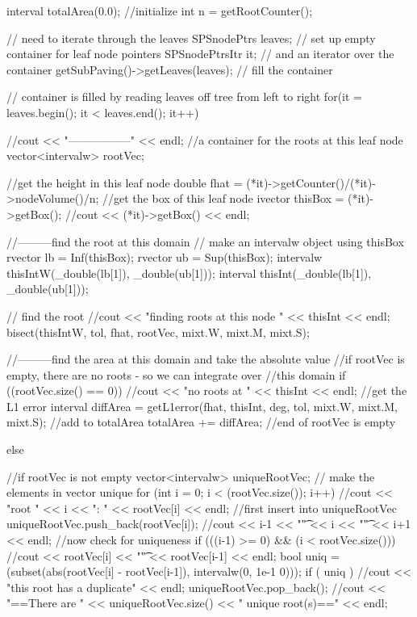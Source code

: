 \begin{DoxyCode}
{
  interval totalArea(0.0); //initialize
  int n = getRootCounter();

  // need to iterate through the leaves
  SPSnodePtrs leaves; // set up empty container for leaf node pointers
  SPSnodePtrsItr it; // and an iterator over the container
  getSubPaving()->getLeaves(leaves); // fill the container
  
  // container is filled by reading leaves off tree from left to right
  for(it = leaves.begin(); it < leaves.end(); it++) {
    //cout << "-----------------" << endl;
    //a container for the roots at this leaf node
    vector<intervalw> rootVec;
    
    //get the height in this leaf node
    double fhat = (*it)->getCounter()/(*it)->nodeVolume()/n;
    //get the box of this leaf node
    ivector thisBox = (*it)->getBox();
    //cout << (*it)->getBox() << endl;
    
    //---------find the root at this domain
    // make an intervalw object using thisBox
    rvector lb = Inf(thisBox);
    rvector ub = Sup(thisBox);
    intervalw thisIntW(_double(lb[1]), _double(ub[1]));
    interval thisInt(_double(lb[1]), _double(ub[1]));
    
    // find the root
    //cout << "finding roots at this node " << thisInt << endl;
    bisect(thisIntW, tol, fhat, rootVec, mixt.W, mixt.M, mixt.S); 

    //---------find the area at this domain and take the absolute value
    //if rootVec is empty, there are no roots - so we can integrate over
    //this domain
    if ((rootVec.size() == 0)) { 
      //cout << "no roots at " << thisInt << endl;
      //get the L1 error
      interval diffArea = getL1error(fhat, thisInt, deg, tol, mixt.W, mixt.M, 
      mixt.S);
      //add to totalArea
      totalArea += diffArea;
    } //end of rootVec is empty

    else { //if rootVec is not empty
      vector<intervalw> uniqueRootVec;
      // make the elements in vector unique
      for (int i = 0; i < (rootVec.size()); i++) {
        //cout << "root " << i << ": " << rootVec[i] << endl;
        //first insert into uniqueRootVec
        uniqueRootVec.push_back(rootVec[i]);
        //cout << i-1 << "\t" << i << "\t" << i+1 << endl;
        //now check for uniqueness
        if (((i-1) >= 0) && (i < rootVec.size())) {
          //cout << rootVec[i] << "\t" << rootVec[i-1] << endl;
          bool uniq = (subset(abs(rootVec[i] - rootVec[i-1]), intervalw(0, 1e-1
      0)));
          if ( uniq ) { 
            //cout << "this root has a duplicate" << endl;
            uniqueRootVec.pop_back(); }
        }
      }
      //cout << "==There are " << uniqueRootVec.size() << " unique root(s)=="
       << endl;

}}}
\end{DoxyCode}
